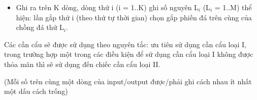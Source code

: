 \begin{itemize}
	\item Ghi ra trên K dòng, dòng thứ i (i = 1..K) ghi số nguyên L$_i$ (L$_i$ = 1..M) thể hiện: lần gắp thứ i (theo thứ tự thời gian) chọn gắp phiến đá trên cùng của chồng đá thứ L$_i$.
\end{itemize}

Các cần cẩu sẽ được sử dụng theo nguyên tắc: ưu tiên sử dụng cần cẩu loại I, trong trường hợp một trong các điều kiện để sử dụng cần cẩu loại I không được thỏa mãn thì sẽ sử dụng đến chiếc cần cẩu loại II.

(Mỗi số trên cùng một dòng của input/output được/phải ghi cách nhau ít nhất một dấu cách trống)